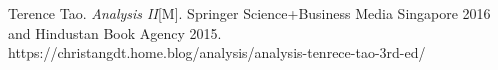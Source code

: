 \documentclass[12pt, a4paper, oneside]{ctexart}
\begin{document}
\newpage

\begin{thebibliography}{99}
    Terence Tao. \emph{Analysis II}[M]. Springer Science+Business Media Singapore 2016 and Hindustan Book Agency 2015.
    https://christangdt.home.blog/analysis/analysis-tenrece-tao-3rd-ed/
\end{thebibliography}


\end{document}
